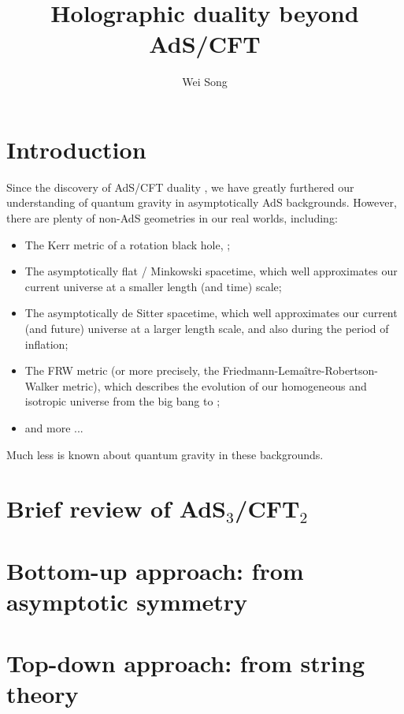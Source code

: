 \documentclass[11pt,a4paper]{article}
\title{Holographic duality beyond AdS/CFT}
\author[a]{Wei Song}
\affiliation[a]{Yau Mathematical Sciences Center, Tsinghua University, Beijing 100084, China}
\newcommand{\ads}[1]{AdS\ensuremath{_{#1}}}
\newcommand{\cft}[1]{CFT\ensuremath{_{#1}}}
\begin{document}
\maketitle
\setlength{\parskip}{.5\baselineskip}

\section{Introduction}
	
	Since the discovery of AdS/CFT duality \cite{Maldacena:1997re}, we have greatly furthered our understanding of quantum gravity in asymptotically AdS backgrounds. However, there are plenty of non-AdS geometries in our real worlds, including:
	\begin{itemize}%
	\item The Kerr metric of a rotation black hole, ;
	\item The asymptotically flat / Minkowski spacetime, which well approximates our current universe at a smaller length (and time) scale;
	\item The asymptotically de Sitter spacetime, which well approximates our current (and future) universe at a larger length scale, and also during the period of inflation;
	\item The FRW metric (or more precisely, the Friedmann-Lemaître-Robertson-Walker \cite{Friedmann:1924bb,Lemaitre:1933gd,Robertson:1935zz,Walker:1937} metric), which describes the evolution of our homogeneous and isotropic universe from the big bang to  ;
	\item and more ...
	\end{itemize}
	Much less is known about quantum gravity in these backgrounds. 
	
	
\section{Brief review of \ads{3}/\cft{2}}
	
\section{Bottom-up approach: %
			from asymptotic symmetry}
	
	
\section{Top-down approach: %
			from string theory}
	
\end{document}
